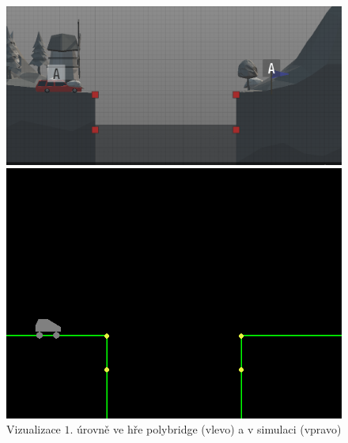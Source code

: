 \begin{figure}[ht]
    \centering
    \begin{minipage}{0.49\textwidth}
        \centering
        \includegraphics[width=\linewidth]{img/poly_lvl1.png}
    \end{minipage}\hfill
    \begin{minipage}{0.49\textwidth}
        \centering
        \includegraphics[width=\linewidth]{img/impl_lvl1.png}
    \end{minipage}
    \caption{Vizualizace $1.$ úrovně ve hře polybridge (vlevo) a v simulaci (vpravo)}
    \label{impl-fig:2}
\end{figure}

